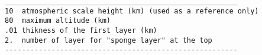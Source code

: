 \begin{verbatim}
_______________________________________________________
10  atmospheric scale height (km) (used as a reference only)
80  maximum altitude (km)
.01 thikness of the first layer (km)
2.  number of layer for "sponge layer" at the top
-------------------------------------------------------
\end{verbatim}
